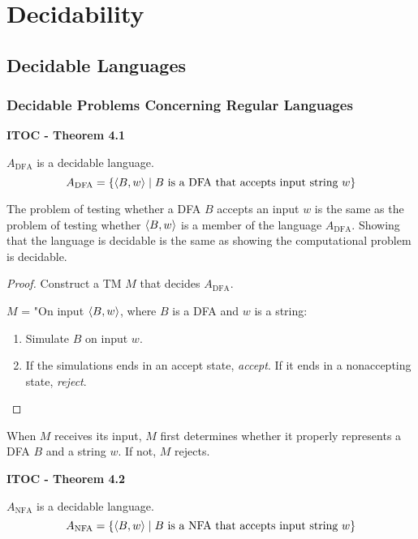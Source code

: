 \section{Decidability}

\subsection{Decidable Languages}

\subsubsection{Decidable Problems Concerning Regular Languages}

\label{lang:ADFA_DCDB}
\begin{shaded}
\textbf{ITOC - Theorem 4.1}

\medskip
$A_\text{DFA}$ is a decidable language.
\[
A_\text{DFA} = \{\langle{B,w}\rangle\mid B \text{ is a DFA that accepts input string } w \}
\]
\end{shaded}

The problem of testing whether a DFA $B$ accepts an input $w$ is the same as the problem of testing whether $\langle{B, w}\rangle$ is a member of the language $A_\text{DFA}$. Showing that the language is decidable is the same as showing the computational problem is decidable.

\begin{mdframed}
\begin{proof}
Construct a TM $M$ that decides $A_\text{DFA}$.

\medskip
$M$ = "On input $\langle{B, w}\rangle$, where $B$ is a DFA and $w$ is a string:
\begin{enumerate}
\item Simulate $B$ on input $w$.
\item If the simulations ends in an accept state, \textit{accept}. If it ends in a nonaccepting state, \textit{reject}.
\end{enumerate}
\end{proof}
\end{mdframed}

When $M$ receives its input, $M$ first determines whether it properly represents a DFA $B$ and a string $w$. If not, $M$ rejects.

\label{lang:ANFA_DCDB}
\begin{shaded}
\textbf{ITOC - Theorem 4.2}

\medskip
$A_\text{NFA}$ is a decidable language.
\[
A_\text{NFA} = \{\langle{B, w}\rangle \mid B \text{ is a NFA that accepts input string } w \}
\]
\end{shaded}

